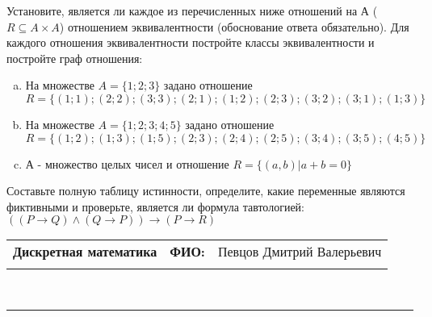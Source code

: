 \documentclass[10pt]{exam}
\newcommand{\class}{Дискретная математика}
\newcommand{\examdate}{}
\begin{document}
\begin{questions}
\question
Установите, является ли каждое из перечисленных ниже отношений на А ($R \subseteq A \times A$) отношением эквивалентности (обоснование ответа обязательно). Для каждого отношения эквивалентности постройте классы 
эквивалентности и постройте граф отношения:
\begin{enumerate} [a)]\setcounter{enumi}{0}
\item На множестве $A = \{1; 2; 3\}$ задано отношение $R = \{(1; 1); (2; 2); (3; 3); (2; 1); (1; 2); (2; 3); (3; 2); (3; 1); (1; 3)\}$
\item На множестве $A = \{1; 2; 3; 4; 5\}$ задано отношение $R = \{(1; 2); (1; 3); (1; 5); (2; 3); (2; 4); (2; 5); (3; 4); (3; 5); (4; 5)\}$
\item А - множество целых чисел и отношение $R = \{(a,b)|a + b = 0\}$
\end{enumerate}\question Составьте полную таблицу истинности, определите, какие переменные являются фиктивными и проверьте, является ли формула тавтологией:
$(( P \rightarrow Q) \land (Q \rightarrow P)) \rightarrow (P \rightarrow R)$

\end{questions}
\newpage
\begin{flushright}
\begin{tabular}{p{2.8in} r l}
\textbf{\class} & \textbf{ФИО:} &Певцов Дмитрий Валерьевич
\\

\textbf{\examdate} &&\\
\end{tabular}\\
\end{flushright}
\rule[1ex]{\textwidth}{.1pt}
\end{document}
